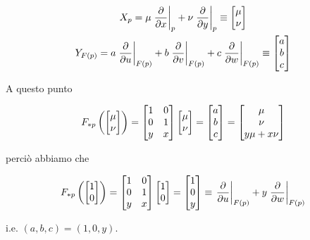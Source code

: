 {\begin{gather}
	X_{p} = \mu \eval{\pdv{x}}_{p} + \nu \eval{\pdv{y}}_{p} \equiv \bmqty{ \mu \\ \nu } \\
	Y_{F(p)} = a \eval{\pdv{u}}_{F(p)} + b \eval{\pdv{v}}_{F(p)} + c \eval{\pdv{w}}_{F(p)} \equiv \bmqty{ a \\ b \\ c }
\end{gather}

A questo punto

\begin{equation}
	F_{*p} \left( \bmqty{ \mu \\ \nu } \right) = \bmqty{ 1 & 0 \\ 0 & 1 \\ y & x } \bmqty{ \mu \\ \nu } %
	= \bmqty{ a \\ b \\ c } %
	= \bmqty{ \mu \\ \nu \\ y \mu + x \nu }
\end{equation}

perciò abbiamo che

\begin{equation}
	F_{*p} \left( \bmqty{ 1 \\ 0 } \right) = \bmqty{ 1 & 0 \\ 0 & 1 \\ y & x } \bmqty{ 1 \\ 0 } %
	= \bmqty{ 1 \\ 0 \\ y } %
	\equiv \eval{\pdv{u}}_{F(p)} + y \eval{\pdv{w}}_{F(p)}
\end{equation}

i.e. $ (a,b,c) = (1,0,y) $.
}


